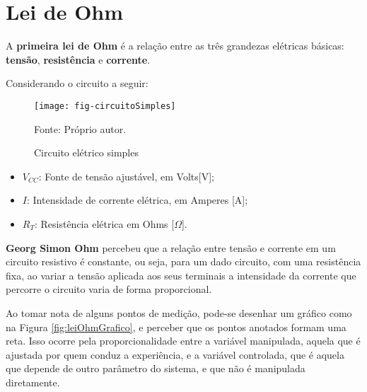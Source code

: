 \section{Lei de Ohm}


A \textbf{primeira lei de Ohm} é a relação entre as três grandezas elétricas básicas: \textbf{tensão}, \textbf{resistência} e \textbf{corrente}.

Considerando o circuito a seguir:

\begin{minipage}{\linewidth}
  \centering
  \begin{minipage}{0.45\linewidth}
    \begin{figure}[H]
      \centering
      \caption{Circuito elétrico simples}
      \label{fig:CircuitoSimples}
      \texttt{[image: fig-circuitoSimples]}

      {\small Fonte: Próprio autor.}
    \end{figure}
  \end{minipage}
  \hspace{0.05\linewidth}
  \begin{minipage}{0.45\linewidth}
    \begin{itemize}
      \item $V_{CC}$: Fonte de tensão ajustável, em Volts[V];
      \item $I$: Intensidade de corrente elétrica, em Amperes [A];
      \item $R_T$: Resistência elétrica em Ohms [$\Omega$].
    \end{itemize}
  \end{minipage}
\end{minipage}

\textbf{Georg Simon Ohm} percebeu que a relação entre tensão e corrente em um circuito resistivo é constante, ou seja, para um dado circuito, com uma resistência fixa, ao variar a tensão aplicada aos seus terminais
a intensidade da corrente que percorre o circuito varia de forma proporcional.

Ao tomar nota de alguns pontos de medição, pode-se desenhar um gráfico como na Figura \ref{fig:leiOhmGrafico}, e perceber que os pontos anotados formam uma reta. Isso ocorre pela proporcionalidade entre a variável manipulada, aquela que é ajustada por quem conduz a experiência, e a variável controlada, que é aquela que depende de outro parâmetro do sistema, e que não é manipulada diretamente.


